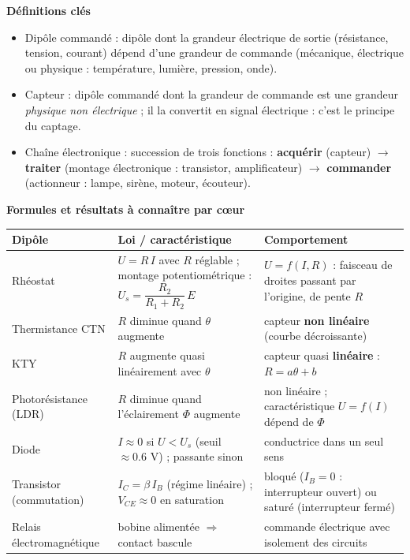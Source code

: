 \documentclass[11pt]{article}
\newcommand{\cle}[1]{{\popxbold\color{popdark}#1}}
\begin{document}
\begin{aretenir}
\textbf{Définitions clés}
\begin{itemize}
  \item \cle{Dipôle commandé} : dipôle dont la grandeur électrique de sortie (résistance, tension, courant) dépend d'une grandeur de commande (mécanique, électrique ou physique : température, lumière, pression, onde).
  \item \cle{Capteur} : dipôle commandé dont la grandeur de commande est une grandeur \emph{physique non électrique} ; il la convertit en signal électrique : c'est le principe du captage.
  \item \cle{Chaîne électronique} : succession de trois fonctions : \textbf{acquérir} (capteur) $\rightarrow$ \textbf{traiter} (montage électronique : transistor, amplificateur) $\rightarrow$ \textbf{commander} (actionneur : lampe, sirène, moteur, écouteur).
\end{itemize}

\textbf{Formules et résultats à connaître par cœur}
\begin{center}
\begin{tabularx}{\linewidth}{|l|X|X|}
\hline
\rowcolor{popblueL} \textbf{Dipôle} & \textbf{Loi / caractéristique} & \textbf{Comportement} \\
\hline
Rhéostat & $U = R\,I$ avec $R$ réglable ; montage potentiométrique : $U_s = \dfrac{R_2}{R_1+R_2}\,E$ & $U=f(I,R)$ : faisceau de droites passant par l'origine, de pente $R$ \\
\hline
Thermistance CTN & $R$ diminue quand $\theta$ augmente & capteur \textbf{non linéaire} (courbe décroissante) \\
\hline
KTY & $R$ augmente quasi linéairement avec $\theta$ & capteur quasi \textbf{linéaire} : $R = a\theta + b$ \\
\hline
Photorésistance (LDR) & $R$ diminue quand l'éclairement $\Phi$ augmente & non linéaire ; caractéristique $U=f(I)$ dépend de $\Phi$ \\
\hline
Diode & $I \approx 0$ si $U < U_s$ (seuil $\approx \num{0,6}$ V) ; passante sinon & conductrice dans un seul sens \\
\hline
Transistor (commutation) & $I_C = \beta\, I_B$ (régime linéaire) ; $V_{CE} \approx 0$ en saturation & bloqué ($I_B=0$ : interrupteur ouvert) ou saturé (interrupteur fermé) \\
\hline
Relais électromagnétique & bobine alimentée $\Rightarrow$ contact bascule & commande électrique avec isolement des circuits \\
\hline
\end{tabularx}
\end{center}


\end{aretenir}
\end{document}

